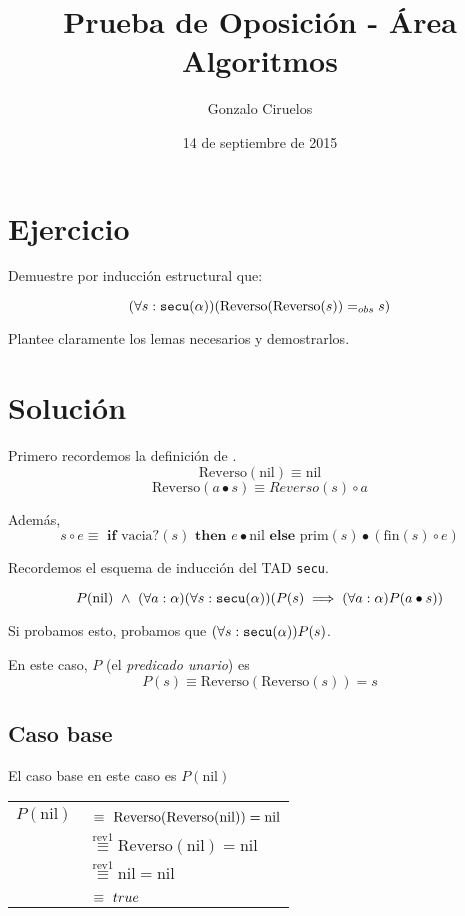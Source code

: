\documentclass[hidelinks,a4paper,10pt, nofootinbib]{article}
\title{Prueba de Oposición - Área Algoritmos}
\author{Gonzalo Ciruelos}
\date{14 de septiembre de 2015}
\newcommand{\tx}[1]{\text{#1}}
\newcommand{\secu}{\ensuremath\texttt{secu}(\alpha)}
\newcommand{\rev}{\text{Reverso}}
\newcommand{\cons}{\bullet}
\newcommand{\snoc}{\circ}
\newcommand{\nil}{\text{nil}}
\newcommand{\prim}{\text{prim}}
\newcommand{\fin}{\text{fin}}
\newcommand{\por}[1]{\overset{\text{#1}}{\equiv}}
\begin{document}
\maketitle

\section*{Ejercicio}

Demuestre por inducción estructural que:

$$(\forall s : \secu)(\tx{Reverso}(\tx{Reverso}(s)) =_{obs} s)$$

Plantee claramente los lemas necesarios y demostrarlos.


\section*{Solución}

Primero recordemos la definición de \rev.
\[\rev(\nil) \equiv \nil \tag{rev1}\]
\[\rev(a \cons s) \equiv Reverso(s) \snoc a \tag{rev2}\]

Además,
\[s \circ e \equiv \textbf{ if } \text{vacia?}(s) \textbf{ then } e \cons \nil \textbf{ else } \prim(s) \cons (\fin(s) \circ e) \tag{snoc}\]

Recordemos el esquema de inducción del TAD \texttt{secu}.

$$P(\nil)\  \land \  (\forall a : \alpha) (\forall s : \secu) (P(s) \implies (\forall a : \alpha) P(a \cons s))$$

Si probamos esto, probamos que $(\forall s : \secu) P(s)$.

En este caso, $P$  (el \emph{predicado unario}) es
$$ P(s) \equiv \rev(\rev(s)) = s$$



\subsection*{Caso base}
El caso base en este caso es $P(\nil)$

\begin{center}
\begin{tabular}{c l}
$P(\nil)$ & $\por{\phantom{rev1}} \rev(\rev(\nil)) = \nil$ \\
          & $\por{rev1} \rev(\nil) = \nil$ \\
          & $\por{rev1} \nil = \nil$  \\
          & $\por{\phantom{rev1}} true$ \\
\end{tabular}
\end{center}
\end{document}
